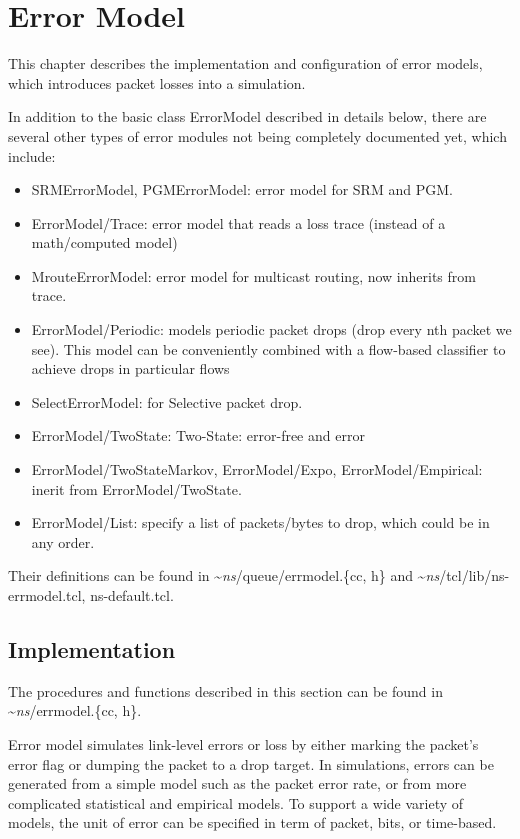 \chapter{Error Model}
\label{chap:error_model}

This chapter describes the implementation and configuration of error
models, which introduces packet losses into a simulation. 

In addition to the basic class ErrorModel described in details below, 
  there are several other types of error modules not being 
  completely documented yet,
  which include:
  \begin{itemize}
    \item SRMErrorModel, PGMErrorModel: 
      error model for SRM and PGM.
    \item ErrorModel/Trace: 
      error model that reads a loss trace (instead of a math/computed model)
    \item MrouteErrorModel:
      error model for multicast routing, now inherits from trace.
    \item ErrorModel/Periodic:
      models periodic packet drops (drop every nth packet we see).
      This model can be conveniently combined with a flow-based classifier
      to achieve drops in particular flows
    \item SelectErrorModel:
       for Selective packet drop.
    \item ErrorModel/TwoState:
      Two-State:  error-free and error
    \item ErrorModel/TwoStateMarkov, ErrorModel/Expo, ErrorModel/Empirical:
      inerit from ErrorModel/TwoState.
    \item ErrorModel/List:
      specify a list of packets/bytes to drop,
      which could be in any order.
  \end{itemize}

Their definitions can be found in \textasciitilde\emph{ns}/{queue/errmodel.\{cc, h\}} and
 \textasciitilde\emph{ns}/{tcl/lib/ns-errmodel.tcl, ns-default.tcl}.

\section{Implementation}

The procedures and functions described in this section can be found in
\textasciitilde\emph{ns}/{errmodel.\{cc, h\}}.

Error model simulates link-level errors or loss by either marking the
packet's error flag or dumping the packet to a drop target.  In
simulations, errors can be generated from a simple model such as the
packet error rate, or from more complicated statistical and empirical models.
To support a wide variety of models, the unit of error can be specified
in term of packet, bits, or time-based.

